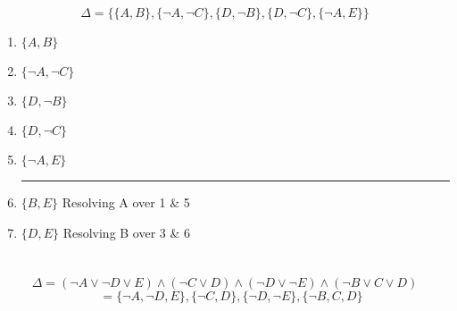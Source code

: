 \documentclass{article}
\begin{document}
 \section{}
 \[\Delta = \{\{A, B\}, \{\lnot A, \lnot C\}, \{D, \lnot B \}, \{D, \lnot C \}, \{\lnot A, E\}\}\]
  \renewcommand{\labelenumi}{\arabic{enumi}.}
 \begin{enumerate}
 \item $\{A, B\}$
 \item $\{\lnot A, \lnot C\}$
 \item $\{D, \lnot B \}$
 \item $\{D, \lnot C \}$
 \item $\{\lnot A, E \}$
 \newline
 \noindent\rule{4cm}{0.4pt}
 \item $\{B, E \}$ \quad Resolving A over 1 \& 5
 \item $\{D, E \}$ \quad Resolving B over 3 \& 6
 \end{enumerate}
 
 \section{}
 \[\Delta = (\lnot A \lor \lnot D \lor E) \land
            (\lnot C \lor D) \land
            (\lnot D \lor \lnot E) \land
            (\lnot B \lor C \lor D) \]
\[  \quad = \{\lnot A, \lnot D, E\},
            \{\lnot C, D\},
            \{\lnot D, \lnot E\},
            \{\lnot B, C, D\} \]
            
\end{document}
